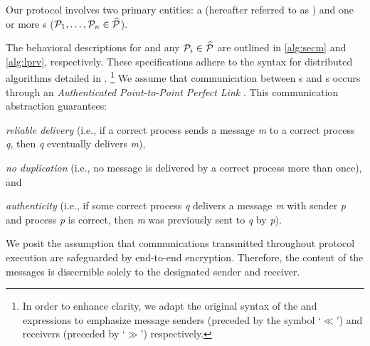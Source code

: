 Our protocol involves two primary entities: a  (hereafter referred to as \SecM) and one or more s ($\mathcal{P}_1, \ldots, \mathcal{P}_n \in \widehat{\mathcal{P}}$). 
\begin{newj}
The behavioral descriptions for {\SecM} and any $\mathcal{P}_i \in \widehat{\mathcal{P}}$  are outlined in \cref{alg:secm} and \cref{alg:lprv}, respectively. These specifications adhere to the syntax for distributed algorithms detailed in \cite{Cachin.etal/2011:ReliableSecureDistributedProgramming}.%
\footnote{In order to enhance clarity, we adapt the original syntax of the  and  expressions to emphasize message senders (preceded by the symbol `$\ll$') and receivers (preceded by `$\gg$') respectively.}
We assume that communication between s and s occurs through an \textit{Authenticated Point-to-Point Perfect Link} \cite{Cachin.etal/2011:ReliableSecureDistributedProgramming}. This communication abstraction guarantees:
\begin{inparaenum}
\item \textit{reliable delivery} (i.e., if a correct process sends a message \textit{m} to a correct
process \textit{q}, then \textit{q} eventually delivers \textit{m}),
\item \textit{no duplication} (i.e., no message is delivered by a correct process more than once), and
\item \textit{authenticity} (i.e., if some correct process \textit{q} delivers a message \textit{m} with sender \textit{p}
and process \textit{p} is correct, then \textit{m} was previously sent to \textit{q} by \textit{p}). 
\end{inparaenum} We posit the assumption that communications transmitted throughout protocol execution are safeguarded by end-to-end encryption. Therefore, the content of the messages is discernible solely to the designated sender and receiver.


\end{newj}
